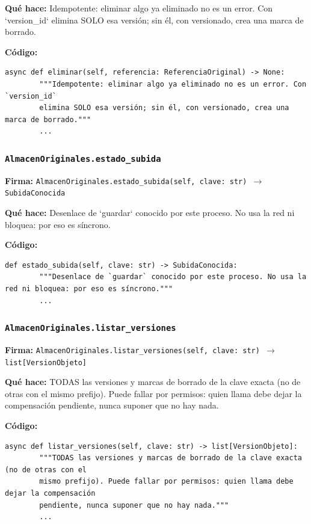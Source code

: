 \documentclass[11pt,a4paper]{article}
\begin{document}
\textbf{Qué hace:} Idempotente: eliminar algo ya eliminado no es un error. Con `version\_id`
elimina SOLO esa versión; sin él, con versionado, crea una marca de borrado.

\textbf{Código:}
\begin{lstlisting}
async def eliminar(self, referencia: ReferenciaOriginal) -> None:
        """Idempotente: eliminar algo ya eliminado no es un error. Con `version_id`
        elimina SOLO esa versión; sin él, con versionado, crea una marca de borrado."""
        ...
\end{lstlisting}

\subsubsection*{\texttt{AlmacenOriginales.estado\_subida}}
\textbf{Firma:} \texttt{AlmacenOriginales.estado\_subida(self, clave: str) $\rightarrow$ SubidaConocida}

\textbf{Qué hace:} Desenlace de `guardar` conocido por este proceso. No usa la red ni bloquea: por eso es síncrono.

\textbf{Código:}
\begin{lstlisting}
def estado_subida(self, clave: str) -> SubidaConocida:
        """Desenlace de `guardar` conocido por este proceso. No usa la red ni bloquea: por eso es síncrono."""
        ...
\end{lstlisting}

\subsubsection*{\texttt{AlmacenOriginales.listar\_versiones}}
\textbf{Firma:} \texttt{AlmacenOriginales.listar\_versiones(self, clave: str) $\rightarrow$ list[VersionObjeto]}

\textbf{Qué hace:} TODAS las versiones y marcas de borrado de la clave exacta (no de otras con el
mismo prefijo). Puede fallar por permisos: quien llama debe dejar la compensación
pendiente, nunca suponer que no hay nada.

\textbf{Código:}
\begin{lstlisting}
async def listar_versiones(self, clave: str) -> list[VersionObjeto]:
        """TODAS las versiones y marcas de borrado de la clave exacta (no de otras con el
        mismo prefijo). Puede fallar por permisos: quien llama debe dejar la compensación
        pendiente, nunca suponer que no hay nada."""
        ...
\end{lstlisting}
\end{document}
